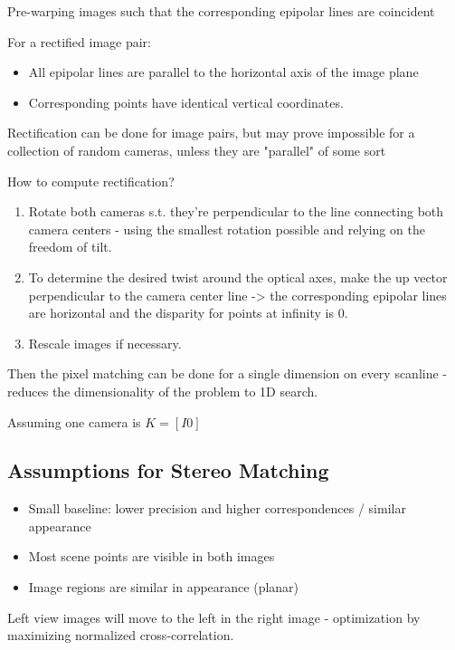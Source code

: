 Pre-warping images such that the corresponding epipolar lines are coincident

For a rectified image pair:

\begin{itemize}
\item All epipolar lines are parallel to the horizontal axis of the image plane
\item Corresponding points have identical vertical coordinates.
\end{itemize}

Rectification can be done for image pairs, but may prove impossible for a collection of random cameras, unless they are "parallel" of some sort

How to compute rectification?

\begin{enumerate}
\item Rotate both cameras s.t. they're perpendicular to the line connecting both camera centers - using the smallest rotation possible and relying on the freedom of tilt. 
\item To determine the desired twist around the optical axes, make the up vector perpendicular to the camera center line -> the corresponding epipolar lines are horizontal and the disparity for points at infinity is 0. 
\item Rescale images if necessary.
\end{enumerate}

Then the pixel matching can be done for a single dimension on every scanline - reduces the dimensionality of the problem to 1D search. 

Assuming one camera is $K = [ I 0]$


\subsection{Assumptions for Stereo Matching}

\begin{itemize}
\item Small baseline: lower precision and higher correspondences  / similar appearance
\item Most scene points are visible in both images
\item Image regions are similar in appearance (planar)
\end{itemize}

Left view images will move to the left in the right image - optimization by maximizing normalized cross-correlation.

